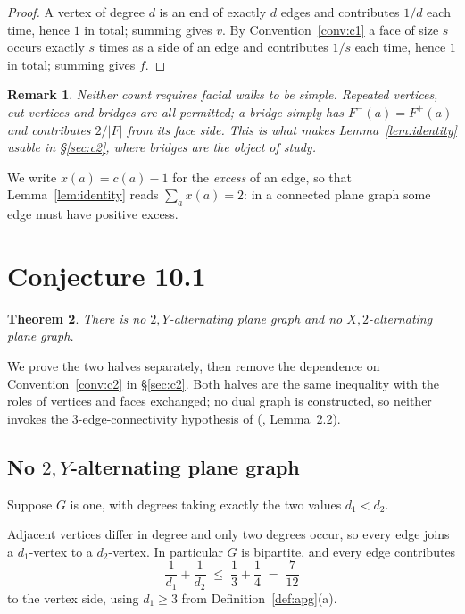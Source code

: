 \documentclass{baustms}
\theoremstyle{cupthm}
\newtheorem{theorem}{Theorem}[section]
\theoremstyle{cupdefn}
\theoremstyle{cuprem}
\newtheorem{remark}[theorem]{Remark}
\begin{document}
\begin{proof}
A vertex of degree $d$ is an end of exactly $d$ edges and contributes $1/d$ each
time, hence $1$ in total; summing gives $v$. By Convention~\ref{conv:c1} a face
of size $s$ occurs exactly $s$ times as a side of an edge and contributes $1/s$
each time, hence $1$ in total; summing gives $f$.
\end{proof}

\begin{remark}
Neither count requires facial walks to be simple. Repeated vertices, cut
vertices and bridges are all permitted; a bridge simply has
$F^-(a) = F^+(a)$ and contributes $2/|F|$ from its face side. This is what makes
Lemma~\ref{lem:identity} usable in \S\ref{sec:c2}, where bridges are the object
of study.
\end{remark}

We write $x(a) = c(a) - 1$ for the \emph{excess} of an edge, so that
Lemma~\ref{lem:identity} reads $\sum_a x(a) = 2$: in a connected plane graph
some edge must have positive excess.

\section{Conjecture 10.1}\label{sec:101}

\begin{theorem}\label{thm:101}
There is no $2,Y$-alternating plane graph and no $X,2$-alternating plane graph.
\end{theorem}

We prove the two halves separately, then remove the dependence on
Convention~\ref{conv:c2} in \S\ref{sec:c2}. Both halves are the same inequality
with the roles of vertices and faces exchanged; no dual graph is constructed, so
neither invokes the $3$-edge-connectivity hypothesis of
(\cite{AHSSV2015}, Lemma~2.2).

\subsection{No $2,Y$-alternating plane graph}

Suppose $G$ is one, with degrees taking exactly the two values $d_1 < d_2$.

Adjacent vertices differ in degree and only two degrees occur, so every edge
joins a $d_1$-vertex to a $d_2$-vertex. In particular $G$ is bipartite, and
every edge contributes
\[
  \frac{1}{d_1} + \frac{1}{d_2} \;\le\; \frac13 + \frac14 \;=\; \frac{7}{12}
\]
to the vertex side, using $d_1 \ge 3$ from Definition~\ref{def:apg}(a).
\end{document}
